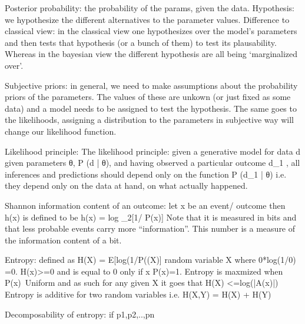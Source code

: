 Posterior probability: the probability of the params, given the data.
Hypothesis: we hypothesize the different alternatives to the parameter values. 
Difference to classical view: in the classical view one hypothesizes over the model’s parameters and then tests that hypothesis (or a bunch of them) to test its plausability. Whereas in the bayesian view the different hypothesis are all being ‘marginalized over’.

Subjective priors: in general, we need to make assumptions about the probability priors of the parameters. The values of these are unkown (or just fixed as some data) and a model needs to be assigned to test the hypothesis. The same goes to the likelihoods, assigning a distribution to the parameters in subjective way will change our likelihood function.

Likelihood principle: The likelihood principle: given a generative model for data d given parameters θ, P (d | θ), and having observed a particular outcome d_1 , all inferences and predictions should depend only on the function P (d_1 | θ) i.e. they depend only on the data at hand, on what actually happened. 

Shannon information content of an outcome: let x be an event/ outcome then h(x) is defined to be h(x) = log _2[1/ P(x)]
Note that it is measured in bits and that less probable events carry more “information”.
This number is a measure of the information content of a bit. 

Entropy: defined as H(X) =  E[log(1/P((X)] random variable X where 0*log(1/0) =0. H(x)>=0 and is equal to 0 only if x P(x)=1. 
Entropy is maxmized when P(x)~Uniform and as such for any given X it goes that H(X) <=log(|A(x)|)
Entropy is additive for two random variables i.e. H(X,Y) = H(X) + H(Y)

Decomposability of entropy:  if {p1,p2,..,pn}



